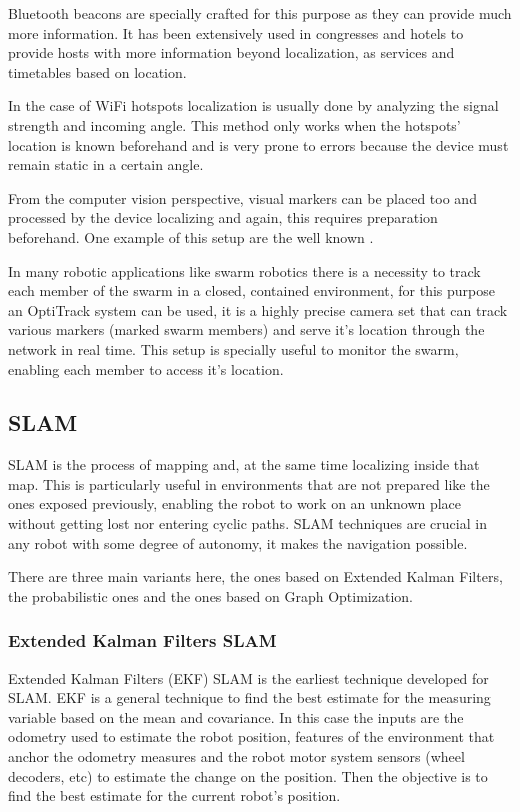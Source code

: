       Bluetooth beacons are specially crafted for this purpose as they can provide much more information. It has been extensively used in congresses and hotels to provide hosts with more information beyond localization, as services and timetables based on location. 

      In the case of WiFi hotspots localization is usually done by analyzing the signal strength and incoming angle. This method only works when the hotspots' location is known beforehand and is very prone to errors because the device must remain static in a certain angle.

      From the computer vision perspective, visual markers can be placed too and processed by the device localizing and again, this requires preparation beforehand. One example of this setup are the well known \cite{romeroramirez201838}.

      In many robotic applications like swarm robotics there is a necessity to track each member of the swarm in a closed, contained environment, for this purpose an OptiTrack system \cite{optitrack_web} can be used, it is a highly precise camera set that can track various markers (marked swarm members) and serve it's location through the network in real time. This setup is specially useful to monitor the swarm, enabling each member to access it's location.

    \subsection{SLAM} \label{ch_3:sect:localization:slam}

      SLAM is the process of mapping and, at the same time localizing inside that map. This is particularly useful in environments that are not prepared like the ones exposed previously, enabling the robot to work on an unknown place without getting lost nor entering cyclic paths. SLAM techniques are crucial in any robot with some degree of autonomy, it makes the navigation possible. 

      There are three main variants here, the ones based on Extended Kalman Filters, the probabilistic ones and the ones based on Graph Optimization.

    \subsubsection{Extended Kalman Filters SLAM} \label{ch_3:sect:localization:ekf}

      Extended Kalman Filters (EKF) SLAM is the earliest technique developed for SLAM. EKF is a general technique to find the best estimate for the measuring variable based on the mean and covariance. In this case the inputs are the odometry used to estimate the robot position, features of the environment that anchor the odometry measures and the robot motor system sensors (wheel decoders, etc) to estimate the change on the position. Then the objective is to find the best estimate for the current robot's position.

